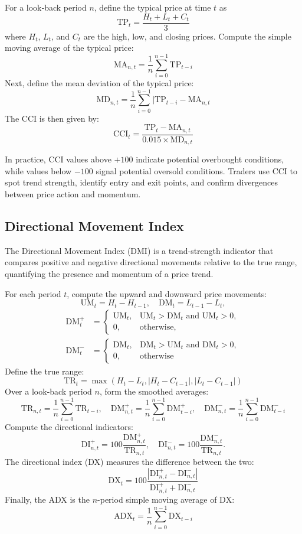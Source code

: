 For a look‐back period \(n\), define the typical price at time \(t\) as
\[\mathrm{TP}_t = \frac{H_t + L_t + C_t}{3}\]
where \(H_t\), \(L_t\), and \(C_t\) are the high, low, and closing prices.  Compute the simple moving average of the typical price:
\[\mathrm{MA}_{n,t} = \frac{1}{n} \sum_{i=0}^{n-1} \mathrm{TP}_{t-i}\]
Next, define the mean deviation of the typical price:
\[\mathrm{MD}_{n,t} = \frac{1}{n} \sum_{i=0}^{n-1} |\mathrm{TP}_{t-i} - \mathrm{MA}_{n,t}\]
The CCI is then given by:
\[\mathrm{CCI}_t = \frac{\mathrm{TP}_t - \mathrm{MA}_{n,t}}{0.015 \times \mathrm{MD}_{n,t}}\]

In practice, \gls{CCI} values above \(+100\) indicate potential overbought conditions, while values below \(-100\) signal potential oversold conditions. Traders use \gls{CCI} to spot trend strength, identify entry and exit points, and confirm divergences between price action and momentum.

\subsection{Directional Movement Index}
The Directional Movement Index (DMI) is a trend‐strength indicator that compares positive and negative directional movements relative to the true range, quantifying the presence and momentum of a price trend.

For each period \(t\), compute the upward and downward price movements:
\[
\mathrm{UM}_t = H_t - H_{t-1}, 
\quad
\mathrm{DM}_t = L_{t-1} - L_t,
\]
\[
\begin{aligned}
\mathrm{DM}^+_t &= 
  \begin{cases}
    \mathrm{UM}_t, & \mathrm{UM}_t > \mathrm{DM}_t \text{ and } \mathrm{UM}_t > 0,\\
    0, & \text{otherwise},
  \end{cases}
  \\
\mathrm{DM}^-_t &= 
  \begin{cases}
    \mathrm{DM}_t, & \mathrm{DM}_t > \mathrm{UM}_t \text{ and } \mathrm{DM}_t > 0,\\
    0, & \text{otherwise}
  \end{cases}
\end{aligned}
\]
Define the true range:
\[\mathrm{TR}_t = \max(H_t - L_t, |H_t - C_{t-1}|, |L_t - C_{t-1}|)\]
Over a look‐back period \(n\), form the smoothed averages:
\[\mathrm{TR}_{n,t} = \frac{1}{n} \sum_{i=0}^{n-1} \mathrm{TR}_{t-i}, \quad \mathrm{DM}^+_{n,t} = \frac{1}{n} \sum_{i=0}^{n-1}\mathrm{DM}^+_{t-i}, \quad \mathrm{DM}^-_{n,t} = \frac{1}{n} \sum_{i=0}^{n-1} \mathrm{DM}^-_{t-i}\]
Compute the directional indicators:
\[\mathrm{DI}^+_{n,t} =100 \frac{\mathrm{DM}^+_{n,t}}{\mathrm{TR}_{n,t}}, \quad \mathrm{DI}^-_{n,t} = 100 \frac{\mathrm{DM}^-_{n,t}}{\mathrm{TR}_{n,t}}.\]
The directional index (DX) measures the difference between the two:
\[\mathrm{DX}_t = 100 \frac{|\mathrm{DI}^+_{n,t} - \mathrm{DI}^-_{n,t}|}{\mathrm{DI}^+_{n,t} + \mathrm{DI}^-_{n,t}}\]
Finally, the \gls{ADX} is the \(n\)-period simple moving average of \(\mathrm{DX}\):
\[\mathrm{ADX}_t = \frac{1}{n} \sum_{i=0}^{n-1} \mathrm{DX}_{t-i}\]

